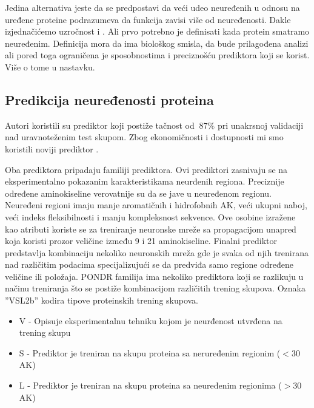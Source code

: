 Jedina alternativa jeste da se predpostavi da veći udeo neuređenih u odnosu na
uređene proteine podrazumeva da funkcija zavisi više od neuređenosti.  Dakle
izjednačićemo uzročnost  i . Ali prvo
potrebno je definisati kada protein smatramo neuređenim.  Definicija mora da
ima biološkog smisla, da bude prilagođena analizi ali pored toga ograničena je
sposobnostima i preciznošću prediktora koji se korist.  Više o tome u nastavku.


\subsection{Predikcija neuređenosti proteina}

Autori \parencite{Xie2007} koristili su  prediktor koji
postiže tačnost od $~87\%$ pri unakrsnoj validaciji nad uravnoteženim test
skupom.  Zbog ekonomičnosti i dostupnosti mi smo koristili noviji prediktor
.

Oba prediktora pripadaju   familiji prediktora. Ovi prediktori zasnivaju se na eksperimentalno
pokazanim karakteristikama neurđenih regiona. Preciznije određene aminokiseline
verovatnije su da se jave u neuređenom regionu. Neuređeni regioni imaju manje
aromatičnih i hidrofobnih AK, veći ukupni naboj, veći indeks fleksibilnosti i
manju kompleksnost sekvence. Ove osobine izražene kao atributi koriste se za
treniranje neuronske mreže sa propagacijom unapred  koja koristi prozor veličine između 9 i 21 aminokiseline.
Finalni prediktor predstavlja kombinaciju nekoliko neuronskih mreža gde je
svaka od njih trenirana nad različitim podacima specijalizujući se da predviđa
samo regione određene veličine ili položaja. PONDR familija ima nekoliko
prediktora koji  se razlikuju u načinu treniranja što se postiže kombinacijom
različitih trening skupova.  Oznaka ''VSL2b'' kodira tipove proteinskih trening
skupova.
\begin{itemize}
  \item V - Opisuje eksperimentalnu tehniku kojom je neurđenost utvrđena na
    trening skupu 
  \item S - Prediktor je treniran na skupu proteina sa 
      neruređenim
    regionim ($<30$ AK)
  \item L - Prediktor je treniran na skupu proteina sa 
    neuređenim regionima ($>30$ AK)
\end{itemize}

